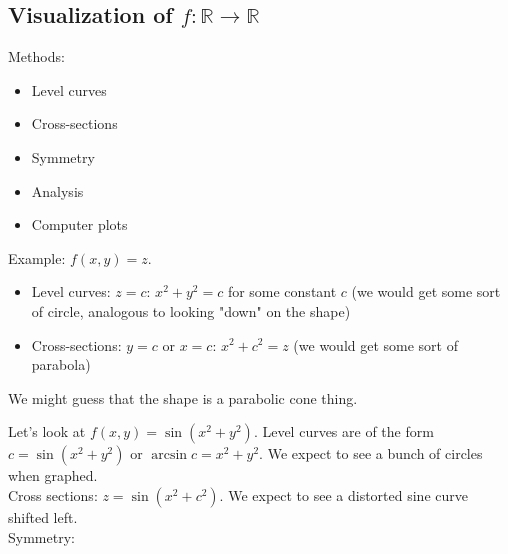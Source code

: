 \documentclass[12pt]{article}
\newcommand{\R}{\mathbb{R}}
\begin{document}
\subsection{Visualization of $f:\R\to\R$}
Methods:
\begin{itemize}
    \item Level curves
    \item Cross-sections
    \item Symmetry
    \item Analysis
    \item Computer plots
\end{itemize}
Example: $f(x,y)=z$.
\begin{itemize}
    \item Level curves: $z=c$: $x^2+y^2=c$ for some constant $c$ (we would get some sort of circle, analogous to looking "down" on the shape)
    \item Cross-sections: $y=c$ or $x=c$: $x^2+c^2=z$ (we would get some sort of parabola)
\end{itemize}
We might guess that the shape is a parabolic cone thing.

Let's look at $f(x,y)=\sin(x^2+y^2)$. Level curves are of the form $c=\sin(x^2+y^2)$ or $\arcsin c=x^2+y^2$. We expect to see a bunch of circles when graphed.\\
Cross sections: $z=\sin(x^2+c^2)$. We expect to see a distorted sine curve shifted left.\\
Symmetry:
\end{document}
